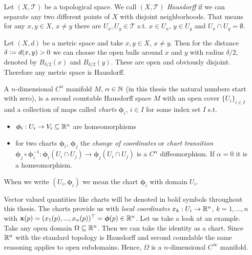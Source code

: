 \documentclass[../master_thesis.tex]{subfiles}
\begin{document}
\begin{definition}
    Let $(X, \mathcal{T})$ be a topological space. We call $(X, \mathcal{T})$
    \textit{Hausdorff} if we can separate any two different points of $X$
    with disjoint neighborhoods. That means for any $x,y \in X$, 
    $x\neq y$ there are $U_x, U_y \in \mathcal{T}$ s.t. 
    $x \in U_x$, $y \in U_y$ and $U_x \cap U_y = \emptyset$.
\end{definition}

\begin{example}
    Let $(X,d)$ be a metric space and take 
    $x,y \in X$, $x\neq y$. Then for the distance 
    $\delta \vcentcolon= d(x,y) > 0$ we can choose the open balls around $x$ and 
    $y$ with radius 
    $\delta/2$, denoted by $B_{\delta/2}(x)$ and $B_{\delta/2}(y)$. These are 
    open and obviously disjoint. Therefore any metric space is Hausdorff. 
\end{example}

\begin{definition}[Manifold]
    A $n$-dimensional $C^\alpha$ manifold $M$, $\alpha \in \mathbb{N}$ (in this thesis 
    the natural numbers start with zero), 
    is a second countable Hausdorff 
    space $M$ with an open cover $\{ U_i \} _{i\in I}$
    and a collection of maps called \textit{charts} $\boldsymbol{\phi}_i$, $i\in I$ for 
    some index set $I$ s.t.
    \begin{itemize}
        \item $\boldsymbol{\phi}_i: U_i \rightarrow V_i \subseteq \mathbb{R}^{n}$
            are homeomorphisms
        \item for two charts $\boldsymbol{\phi}_i$, $\boldsymbol{\phi}_j$ the 
            \textit{change of coordinates} or 
            \textit{chart transition} $\boldsymbol{\phi}_j \circ \boldsymbol{\phi}_i^{-1}: 
            \boldsymbol{\phi}_i(U_i \cap U_j) \rightarrow \boldsymbol{\phi}_j(U_i \cap U_j)$ 
            is a $C^\alpha$ diffeomorphism. If $\alpha=0$ it is a homeomorphism.
    \end{itemize}
    When we write $(U_i, \bm{\phi}_i)$ we mean the chart $\bm{\phi}_i$ with domain $U_i$.
\end{definition}
Vector valued quantities like charts will be denoted in bold symbols throughout this thesis.
The charts provide us with \textit{local coordinates} $x_k: U_i \rightarrow \mathbb{R}^n$,
$k = 1, ..., n$ with $\mathbf{x}(p) = (x_1(p),...,x_n(p))^\top = \boldsymbol{\phi}(p) \in \mathbb{R}^n$.
Let us take a look at an example. Take any open domain 
$\Omega \subseteq \mathbb{R}^n$. Then we can take the identity as a chart.
Since $\mathbb{R}^n$ with the standard topology is Hausdorff and second coundable
the same reasoning applies to open subdomains. Hence, $\Omega$ is a 
$n$-dimensional $C^\infty$ manifold. 
\end{document}

